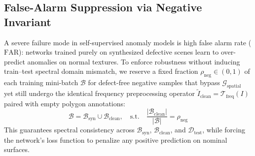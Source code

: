 \subsection{False-Alarm Suppression via Negative Invariant}
A severe failure mode in self-supervised anomaly models is high false alarm rate ($\text{FAR}$): networks trained purely on synthesized defective scenes learn to over-predict anomalies on normal textures. To enforce robustness without inducing train--test spectral domain mismatch, we reserve a fixed fraction $\rho_{\text{neg}} \in (0, 1)$ of each training mini-batch $\mathcal{B}$ for defect-free negative samples that bypass $\mathcal{G}_{\text{spatial}}$ yet still undergo the identical frequency preprocessing operator $\tilde{I}_{\text{clean}} = \mathcal{T}_{\text{freq}}(I)$ paired with empty polygon annotations:
\begin{equation}
\label{eq:neg_batch}
\mathcal{B} = \mathcal{B}_{\text{syn}} \cup \mathcal{B}_{\text{clean}}, \quad \text{s.t.} \quad \frac{|\mathcal{B}_{\text{clean}}|}{|\mathcal{B}|} = \rho_{\text{neg}}
\end{equation}
This guarantees spectral consistency across $\mathcal{B}_{\text{syn}}$, $\mathcal{B}_{\text{clean}}$, and $\mathcal{D}_{\text{test}}$, while forcing the network's loss function to penalize any positive prediction on nominal surfaces.

